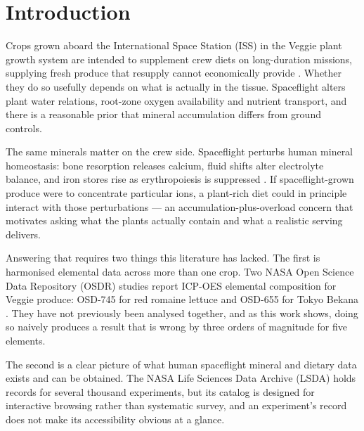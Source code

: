 \section{Introduction}

Crops grown aboard the International Space Station (ISS) in the Veggie plant
growth system are intended to supplement crew diets on long-duration missions,
supplying fresh produce that resupply cannot economically provide
\citep{massa2017}. Whether they do so usefully depends on what is actually in
the tissue. Spaceflight alters plant water relations, root-zone oxygen
availability and nutrient transport, and there is a reasonable prior that
mineral accumulation differs from ground controls.

The same minerals matter on the crew side. Spaceflight perturbs human mineral
homeostasis: bone resorption releases calcium, fluid shifts alter electrolyte
balance, and iron stores rise as erythropoiesis is suppressed
\citep{smith2005,zheng2023}. If spaceflight-grown produce were to concentrate
particular ions, a plant-rich diet could in principle interact with those
perturbations --- an accumulation-plus-overload concern that motivates asking
what the plants actually contain and what a realistic serving delivers.

Answering that requires two things this literature has lacked. The first is
harmonised elemental data across more than one crop. Two NASA Open Science Data
Repository (OSDR) studies report ICP-OES elemental composition for Veggie
produce: OSD-745 for red romaine lettuce \citep{khodadad2020,osdr745} and
OSD-655 for Tokyo Bekana \citep{bunchek2024,osdr655}. They have not previously
been analysed together, and as this work shows, doing so naively produces a
result that is wrong by three orders of magnitude for five elements.

The second is a clear picture of what human spaceflight mineral and dietary data
exists and can be obtained. The NASA Life Sciences Data Archive (LSDA) holds
records for several thousand experiments, but its catalog is designed for
interactive browsing rather than systematic survey, and an experiment's record
does not make its accessibility obvious at a glance.

